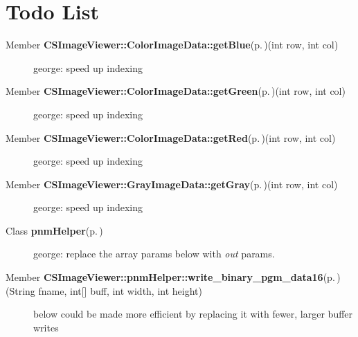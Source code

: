 \section{Todo List}\label{todo}
\label{todo__todo000003}
 \begin{description}
\item[Member {\bf CSImage\-Viewer::Color\-Image\-Data::get\-Blue}{\rm (p.\,\pageref{class_c_s_image_viewer_1_1_color_image_data_2d270d661f5cfa7d4be1e66701b55376})}(int row, int col) ]george: speed up indexing \end{description}


\label{todo__todo000002}
 \begin{description}
\item[Member {\bf CSImage\-Viewer::Color\-Image\-Data::get\-Green}{\rm (p.\,\pageref{class_c_s_image_viewer_1_1_color_image_data_eb04f53da669ba68d0ddd2dfc0ce9f9e})}(int row, int col) ]george: speed up indexing \end{description}


\label{todo__todo000001}
 \begin{description}
\item[Member {\bf CSImage\-Viewer::Color\-Image\-Data::get\-Red}{\rm (p.\,\pageref{class_c_s_image_viewer_1_1_color_image_data_3c7179eb0903415f89e40451632deca4})}(int row, int col) ]george: speed up indexing \end{description}


\label{todo__todo000004}
 \begin{description}
\item[Member {\bf CSImage\-Viewer::Gray\-Image\-Data::get\-Gray}{\rm (p.\,\pageref{class_c_s_image_viewer_1_1_gray_image_data_dcb7178c700e5ead72cd80cf91d05c2e})}(int row, int col) ]george: speed up indexing \end{description}


\label{todo__todo000005}
 \begin{description}
\item[Class {\bf pnm\-Helper}{\rm (p.\,\pageref{class_c_s_image_viewer_1_1pnm_helper})} ]george: replace the array params below with {\em out\/} params. \end{description}


\label{todo__todo000007}
 \begin{description}
\item[Member {\bf CSImage\-Viewer::pnm\-Helper::write\_\-binary\_\-pgm\_\-data16}{\rm (p.\,\pageref{class_c_s_image_viewer_1_1pnm_helper_b9389279b59ecaff8492133a68a59b98})}(String fname, int\mbox{[}\mbox{]} buff, int width, int height) ]below could be made more efficient by replacing it with fewer, larger buffer writes \end{description}


